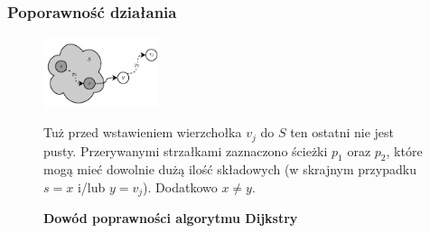 \subsubsection{Poporawność działania}

\begin{figure}[!htbp]
	\includegraphics[width=0.3\textwidth]{Chapter_II/ProofOfDijkstra/a.pdf}
	\caption{\textbf{Dowód poprawności algorytmu Dijkstry}} Tuż przed wstawieniem wierzchołka $v_{j}$ do $S$ ten ostatni nie jest pusty. Przerywanymi strzałkami zaznaczono ścieżki $p_{1}$ oraz $p_{2}$, które mogą mieć dowolnie dużą ilość składowych (w skrajnym przypadku $s = x$ i/lub $y = v_{j}$). Dodatkowo $x \neq y$. \label{fig:proofOfDijkstra}
\end{figure}

